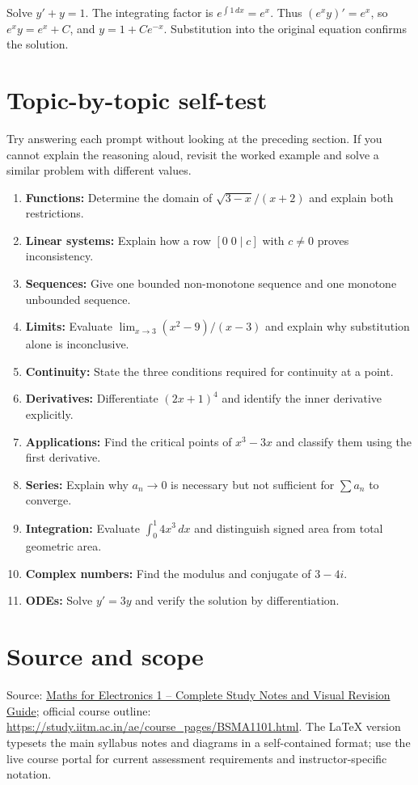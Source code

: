 \documentclass[12pt,a4paper]{article}
\begin{document}
\begin{exampleBox}Solve $y'+y=1$. The integrating factor is $e^{\int1\,dx}=e^x$. Thus $(e^xy)'=e^x$, so $e^xy=e^x+C$, and $y=1+Ce^{-x}$. Substitution into the original equation confirms the solution.
\end{exampleBox}

\section{Topic-by-topic self-test}
Try answering each prompt without looking at the preceding section. If you cannot explain the reasoning aloud, revisit the worked example and solve a similar problem with different values.
\begin{enumerate}
\item \textbf{Functions:} Determine the domain of $\sqrt{3-x}/(x+2)$ and explain both restrictions.
\item \textbf{Linear systems:} Explain how a row $[0\;0\mid c]$ with $c\ne0$ proves inconsistency.
\item \textbf{Sequences:} Give one bounded non-monotone sequence and one monotone unbounded sequence.
\item \textbf{Limits:} Evaluate $\lim_{x\to3}(x^2-9)/(x-3)$ and explain why substitution alone is inconclusive.
\item \textbf{Continuity:} State the three conditions required for continuity at a point.
\item \textbf{Derivatives:} Differentiate $(2x+1)^4$ and identify the inner derivative explicitly.
\item \textbf{Applications:} Find the critical points of $x^3-3x$ and classify them using the first derivative.
\item \textbf{Series:} Explain why $a_n\to0$ is necessary but not sufficient for $\sum a_n$ to converge.
\item \textbf{Integration:} Evaluate $\int_0^1 4x^3\,dx$ and distinguish signed area from total geometric area.
\item \textbf{Complex numbers:} Find the modulus and conjugate of $3-4i$.
\item \textbf{ODEs:} Solve $y'=3y$ and verify the solution by differentiation.
\end{enumerate}

\section{Source and scope}
Source: \href{https://app.notion.com/p/403a8fc810f681ca96d0e9208f719e6f}{Maths for Electronics 1 -- Complete Study Notes and Visual Revision Guide}; official course outline: \url{https://study.iitm.ac.in/ae/course_pages/BSMA1101.html}. The LaTeX version typesets the main syllabus notes and diagrams in a self-contained format; use the live course portal for current assessment requirements and instructor-specific notation.
\end{document}
